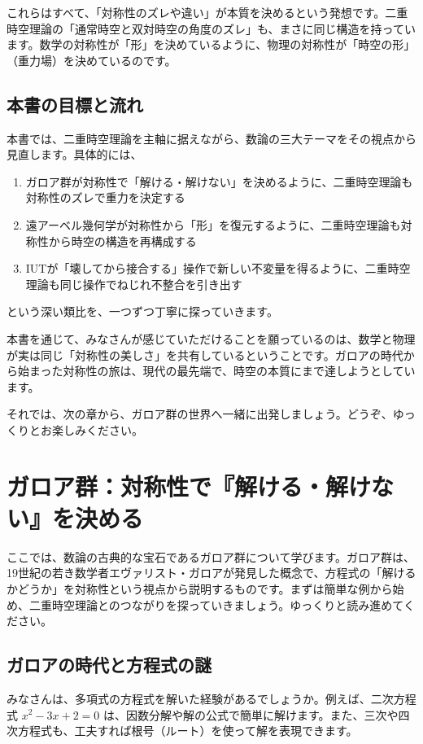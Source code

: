\documentclass[dvipdfmx,12pt,a4paper]{jsarticle}
\begin{document}
これらはすべて、「対称性のズレや違い」が本質を決めるという発想です。二重時空理論の「通常時空と双対時空の角度のズレ」も、まさに同じ構造を持っています。数学の対称性が「形」を決めているように、物理の対称性が「時空の形」（重力場）を決めているのです。

\subsection{本書の目標と流れ}

本書では、二重時空理論を主軸に据えながら、数論の三大テーマをその視点から見直します。具体的には、

\begin{enumerate}
  \item ガロア群が対称性で「解ける・解けない」を決めるように、二重時空理論も対称性のズレで重力を決定する
  \item 遠アーベル幾何学が対称性から「形」を復元するように、二重時空理論も対称性から時空の構造を再構成する
  \item IUTが「壊してから接合する」操作で新しい不変量を得るように、二重時空理論も同じ操作でねじれ不整合を引き出す
\end{enumerate}

という深い類比を、一つずつ丁寧に探っていきます。

本書を通じて、みなさんが感じていただけることを願っているのは、数学と物理が実は同じ「対称性の美しさ」を共有しているということです。ガロアの時代から始まった対称性の旅は、現代の最先端で、時空の本質にまで達しようとしています。

それでは、次の章から、ガロア群の世界へ一緒に出発しましょう。どうぞ、ゆっくりとお楽しみください。

\section{ガロア群：対称性で『解ける・解けない』を決める}

ここでは、数論の古典的な宝石であるガロア群について学びます。ガロア群は、19世紀の若き数学者エヴァリスト・ガロアが発見した概念で、方程式の「解けるかどうか」を対称性という視点から説明するものです。まずは簡単な例から始め、二重時空理論とのつながりを探っていきましょう。ゆっくりと読み進めてください。

\subsection{ガロアの時代と方程式の謎}

みなさんは、多項式の方程式を解いた経験があるでしょうか。例えば、二次方程式 $x^2 - 3x + 2 = 0$ は、因数分解や解の公式で簡単に解けます。また、三次や四次方程式も、工夫すれば根号（ルート）を使って解を表現できます。
\end{document}

